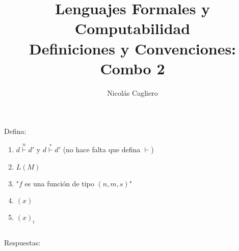 \documentclass{article}
\title{Lenguajes Formales y Computabilidad \\
        \large Definiciones y Convenciones: Combo 2 }
\author{Nicolás Cagliero}
\begin{document}
\maketitle

Defina:
\begin{enumerate}
    \item $d \overset{n}{\vdash} d'$ y $d \overset{*}{\vdash} d'$
            (no hace falta que defina $\vdash$)

    \item $L(M)$
    
    \item "$f$ es una función de tipo $(n, m, s)$"
    
    \item $(x)$
    
    \item $(x)_i$
\end{enumerate}
\(\)
\begin{center}
    Respuestas: 
    \(\)
\end{center}
\end{document}
